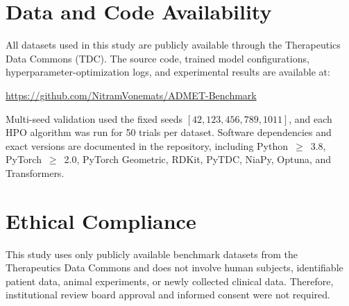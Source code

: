 \documentclass[journal]{IEEEtran}
\begin{document}
\section*{Data and Code Availability}
All datasets used in this study are publicly available through the Therapeutics Data Commons (TDC). The source code, trained model configurations, hyperparameter-optimization logs, and experimental results are available at:
\begin{center}
\url{https://github.com/NitramVonemats/ADMET-Benchmark}
\end{center}

Multi-seed validation used the fixed seeds $[42, 123, 456, 789, 1011]$, and each HPO algorithm was run for 50 trials per dataset. Software dependencies and exact versions are documented in the repository, including Python~$\geq$~3.8, PyTorch~$\geq$~2.0, PyTorch Geometric, RDKit, PyTDC, NiaPy, Optuna, and Transformers.

\section*{Ethical Compliance}
This study uses only publicly available benchmark datasets from the Therapeutics Data Commons and does not involve human subjects, identifiable patient data, animal experiments, or newly collected clinical data. Therefore, institutional review board approval and informed consent were not required.



\end{document}
